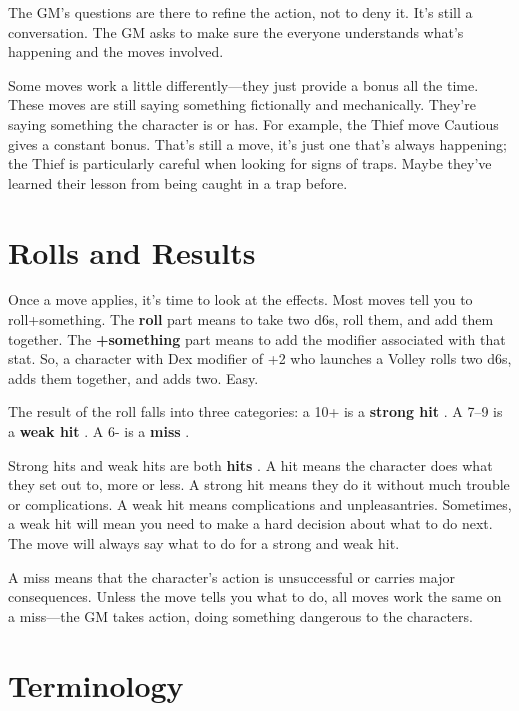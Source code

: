  

The GM's questions are there to refine the action, not to deny it. It's still a conversation. The GM asks to make sure the everyone understands what's happening and the moves involved.

 

Some moves work a little differently—they just provide a bonus all the time. These moves are still saying something fictionally and mechanically. They're saying something the character is or has. For example, the Thief move Cautious gives a constant bonus. That's still a move, it's just one that's always happening; the Thief is particularly careful when looking for signs of traps. Maybe they've learned their lesson from being caught in a trap before.

 
\section{Rolls and Results}    
 

Once a move applies, it's time to look at the effects. Most moves tell you to roll+something. The {\bf roll}  part means to take two d6s, roll them, and add them together. The {\bf +something}  part means to add the modifier associated with that stat. So, a character with Dex modifier of +2 who launches a Volley rolls two d6s, adds them together, and adds two. Easy.

 

The result of the roll falls into three categories: a 10+ is a {\bf strong hit} . A 7–9 is a {\bf weak hit} . A 6- is a {\bf miss} .

 

Strong hits and weak hits are both {\bf hits} . A hit means the character does what they set out to, more or less. A strong hit means they do it without much trouble or complications. A weak hit means complications and unpleasantries. Sometimes, a weak hit will mean you need to make a hard decision about what to do next. The move will always say what to do for a strong and weak hit.

 

A miss means that the character's action is unsuccessful or carries major consequences. Unless the move tells you what to do, all moves work the same on a miss—the GM takes action, doing something dangerous to the characters.

 
\section{Terminology}   
 

